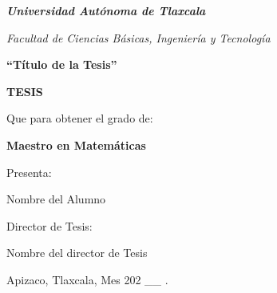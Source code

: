 \documentclass[12pt,letterpaper]{report}
\theoremstyle{plain}
\begin{document}
 \pagestyle{empty}
 \BgThispage%
 \LARGE

 \hspace{2.8cm}
\begin{minipage}[l]{15cm}
\begin{center}
\textbf{\textit{\textcolor[rgb]{0.30,0.04,0.04}{Universidad Autónoma de Tlaxcala}}}
\end{center}

 \Large
\begin{center}
\emph{\textcolor[rgb]{0.43,0.00,0.00}{Facultad de Ciencias  Básicas, Ingeniería y Tecnología}}
\end{center}
\vspace{2cm}
\begin{center}
\textbf{ ``Título de la Tesis'' }
\end{center}
\vspace{1.2cm}

\begin{center}
\textbf{TESIS}

 \vspace{1.2cm}

Que para obtener el grado de:

 \textbf{Maestro en Matemáticas}

\vspace{1.2cm}

 Presenta:

 Nombre del Alumno
\end{center}
\vspace{.5cm}

\begin{center}
Director de Tesis:

Nombre del director de Tesis
\end{center}

\end{minipage}

\vfill{
\begin{flushright}
\normalsize
Apizaco, Tlaxcala, Mes  202 \_\_ .
\end{flushright}
}


\normalsize
%

%
%

\pagestyle{plain}
%
\tableofcontents

\pagestyle{fancy}
\fancyhead[RE]{ }%
\fancyhead[LO]{ }%
%


%
%
%
%
%
%
%


\end{document}
